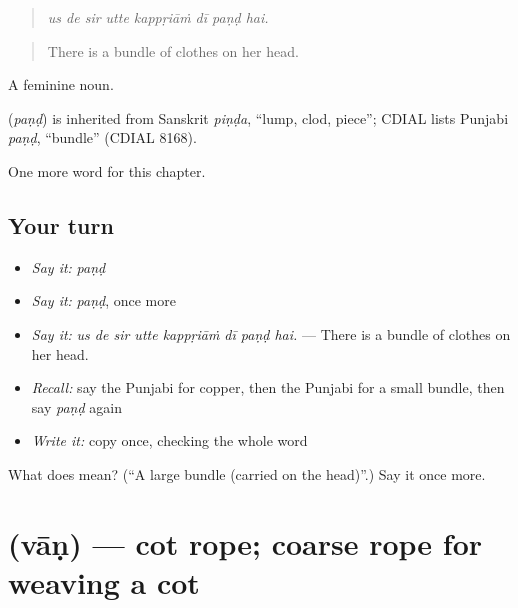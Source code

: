 \begin{quote}
       
\end{quote}

\begin{quote}
\emph{us de sir utte kappṛiāṁ dī paṇḍ hai.}
\end{quote}

\begin{quote}
There is a bundle of clothes on her head.
\end{quote}

A feminine noun.

\begin{cousinweb}
\textbf{} (\emph{paṇḍ}) is inherited from Sanskrit \emph{piṇḍa}, \textquotedblleft{}lump, clod, piece\textquotedblright{}; CDIAL lists Punjabi \emph{paṇḍ}, \textquotedblleft{}bundle\textquotedblright{} (CDIAL 8168).
\end{cousinweb}

\begin{grammarlens}[title={What you've built}]
One more word for this chapter.
\end{grammarlens}

\subsection*{Your turn}
\begin{itemize}
\raggedright
  \item \emph{Say it:} \emph{paṇḍ}
  \item \emph{Say it:} \emph{paṇḍ}, once more
  \item \emph{Say it:} \emph{us de sir utte kappṛiāṁ dī paṇḍ hai.} — There is a bundle of clothes on her head.
  \item \emph{Recall:} say the Punjabi for copper, then the Punjabi for a small bundle, then say \emph{paṇḍ} again
  \item \emph{Write it:} copy \textbf{} once, checking the whole word
\end{itemize}

\begin{tcolorbox}[breakable,colback=teal!4,colframe=teal!35!black,title={Before you move on}]
What does  mean? (\textquotedblleft{}A large bundle (carried on the head)\textquotedblright{}.) Say it once more.
\end{tcolorbox}
\section[\texorpdfstring{\pa{ਵਾਣ} (vāṇ)}{ਵਾਣ (vāṇ)}]{ (vāṇ) — cot rope; coarse rope for weaving a cot}

